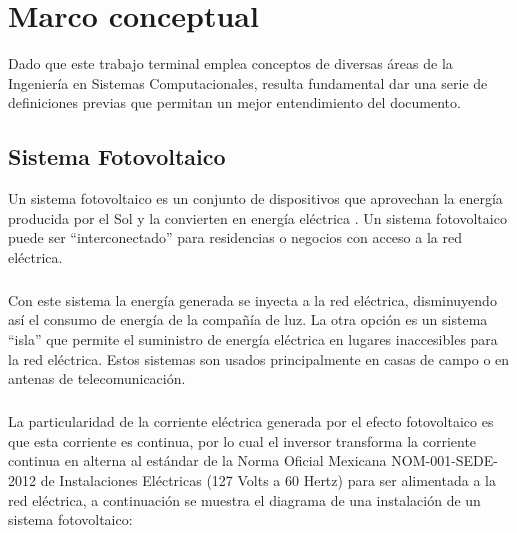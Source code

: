 
\chapter{Marco conceptual}\label{chapter2}

Dado que este trabajo terminal emplea conceptos de diversas áreas de la Ingeniería en Sistemas Computacionales, resulta fundamental dar una serie de definiciones previas que permitan un mejor entendimiento del documento.

\section{Sistema Fotovoltaico}
Un sistema fotovoltaico es un conjunto de dispositivos que aprovechan la energía producida por el Sol y la convierten en energía eléctrica \citep{MarcoTeorico1}. Un sistema fotovoltaico puede ser “interconectado” para residencias o negocios con acceso a la red eléctrica. 

\paragraph{}
Con este sistema la energía generada se inyecta a la red eléctrica, disminuyendo así el consumo de energía de la compañía de luz. La otra opción es un sistema “isla” que permite el suministro de energía eléctrica en lugares inaccesibles para la red eléctrica. Estos sistemas son usados principalmente en casas de campo o en antenas de telecomunicación.
\paragraph{}
La particularidad de la corriente eléctrica generada por el efecto fotovoltaico es que esta corriente es continua, por lo cual el inversor transforma la corriente continua en alterna al estándar de la Norma Oficial Mexicana NOM-001-SEDE-2012 de Instalaciones Eléctricas (127 Volts a 60 Hertz) \citep{NORMA-Electrica} para ser alimentada a la red eléctrica, a continuación se muestra el diagrama de una instalación de un sistema fotovoltaico:

